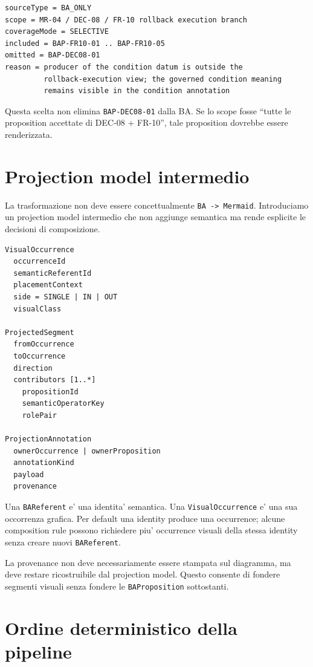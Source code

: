 \documentclass[11pt,a4paper]{article}
\newcommand{\BAR}{\texttt{BAReferent}}
\newcommand{\BAP}{\texttt{BAProposition}}
\begin{document}
\begin{lstlisting}
sourceType = BA_ONLY
scope = MR-04 / DEC-08 / FR-10 rollback execution branch
coverageMode = SELECTIVE
included = BAP-FR10-01 .. BAP-FR10-05
omitted = BAP-DEC08-01
reason = producer of the condition datum is outside the
         rollback-execution view; the governed condition meaning
         remains visible in the condition annotation
\end{lstlisting}

Questa scelta non elimina \texttt{BAP-DEC08-01} dalla BA. Se lo scope fosse ``tutte le proposition accettate di DEC-08 + FR-10'', tale proposition dovrebbe essere renderizzata.

\clearpage
\section{Projection model intermedio}

La trasformazione non deve essere concettualmente \texttt{BA -> Mermaid}. Introduciamo un projection model intermedio che non aggiunge semantica ma rende esplicite le decisioni di composizione.

\begin{lstlisting}
VisualOccurrence
  occurrenceId
  semanticReferentId
  placementContext
  side = SINGLE | IN | OUT
  visualClass

ProjectedSegment
  fromOccurrence
  toOccurrence
  direction
  contributors [1..*]
    propositionId
    semanticOperatorKey
    rolePair

ProjectionAnnotation
  ownerOccurrence | ownerProposition
  annotationKind
  payload
  provenance
\end{lstlisting}

\begin{ddtacore}[title={Identity e occurrence non coincidono}]
Una \BAR{} e' una identita' semantica. Una \texttt{VisualOccurrence} e' una sua occorrenza grafica. Per default una identity produce una occurrence; alcune composition rule possono richiedere piu' occurrence visuali della stessa identity senza creare nuovi \BAR{}.
\end{ddtacore}

La provenance non deve necessariamente essere stampata sul diagramma, ma deve restare ricostruibile dal projection model. Questo consente di fondere segmenti visuali senza fondere le \BAP{} sottostanti.

\clearpage
\section{Ordine deterministico della pipeline}
\end{document}
